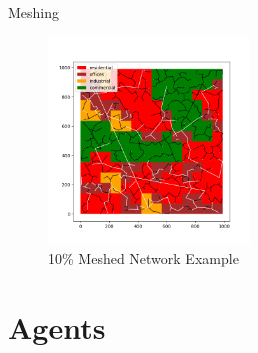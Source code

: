 \documentclass[10pt, aspectratio=169]{beamer}
\begin{document}
\begin{frame}{Meshing}
    \begin{center}
        \begin{figure}
            \centering
            \includegraphics[height=5.5cm, keepaspectratio]{images/meshednetwork.png}
            \caption{10\% Meshed Network Example}
        \end{figure}
    \end{center}
\end{frame}

\section{Agents}
\end{document}
